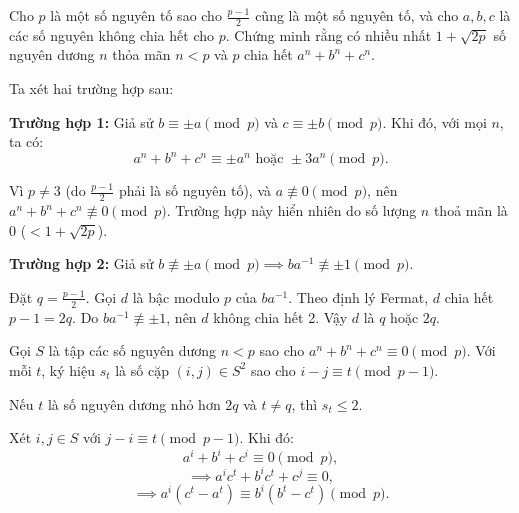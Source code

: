 \ifshowproblemandsoln
\ifshowproblem\begin{problem}\label{problem:CAN-2015-MO-P5}\fi
\ifshowsoln\begin{problem}\fi
    Cho $p$ là một số nguyên tố sao cho $\frac{p-1}{2}$ cũng là một số nguyên tố, và cho $a, b, c$ là các số nguyên không chia hết cho $p$.
    Chứng minh rằng có nhiều nhất $1 + \sqrt{2p}$ số nguyên dương $n$ thỏa mãn $n < p$ và $p$ chia hết $a^n + b^n + c^n$.
\end{problem}
\fi

\ifshowsoln
\begin{soln}\footnotemark
    Ta xét hai trường hợp sau:

    \textbf{Trường hợp 1:} Giả sử \( b \equiv \pm a \pmod{p} \) và \( c \equiv \pm b \pmod{p} \). Khi đó, với mọi \( n \), ta có:
    \[
        a^n + b^n + c^n \equiv \pm a^n \text{ hoặc } \pm 3a^n \pmod{p}.
    \]
    
    Vì \( p \ne 3 \) (do \( \frac{p - 1}{2} \) phải là số nguyên tố), và \( a \not\equiv 0 \pmod{p} \),
    nên \( a^n + b^n + c^n \not\equiv 0 \pmod{p} \). Trường hợp này hiển nhiên do số lượng $n$ thoả mãn là 0 ($<1+\sqrt{2p}$).

    \textbf{Trường hợp 2:} Giả sử \( b \not\equiv \pm a \pmod{p} \implies ba^{-1} \not\equiv \pm1 \pmod{p} \).

    Đặt \( q = \frac{p - 1}{2} \). Gọi $d$ là bậc modulo $p$ của \( ba^{-1} \). Theo định lý Fermat, $d$ chia hết \( p - 1 = 2q \).
    Do \( ba^{-1} \not\equiv \pm1 \), nên $d$ không chia hết 2. Vậy $d$ là \( q \) hoặc \( 2q \).

    Gọi \( S \) là tập các số nguyên dương \( n < p \) sao cho \( a^n + b^n + c^n \equiv 0 \pmod{p} \).
    Với mỗi \( t \), ký hiệu \( s_t \) là số cặp \((i, j) \in S^2\) sao cho \( i - j \equiv t \pmod{p - 1} \).

    \begin{lemma*}
        Nếu \( t \) là số nguyên dương nhỏ hơn \( 2q \) và \( t \ne q \), thì \( s_t \le 2 \).
    \end{lemma*}

    \begin{subproof}
        Xét \( i, j \in S \) với \( j - i \equiv t \pmod{p - 1} \). Khi đó:
        \[
            a^i + b^i + c^i \equiv 0 \pmod{p},
        \]
        \[
            \implies a^i c^t + b^i c^t + c^{j} \equiv 0,
        \]
        \[
            \implies a^i (c^t - a^t) \equiv b^i (b^t - c^t) \pmod{p}.
        \]


\end{subproof}
\end{soln}
\end{problem}
